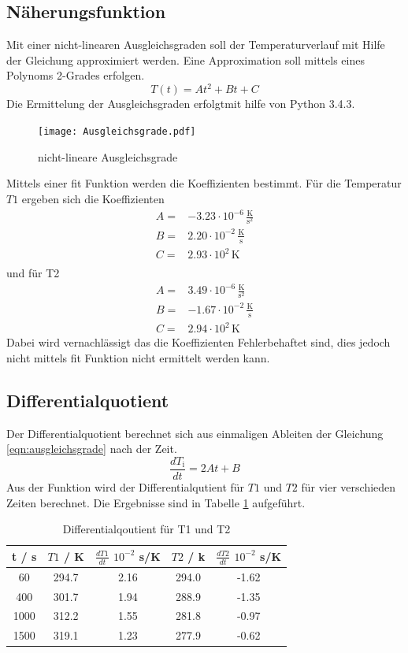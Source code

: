 \subsection{Näherungsfunktion}
Mit einer nicht-linearen Ausgleichsgraden soll der Temperaturverlauf mit Hilfe der Gleichung approximiert werden. Eine Approximation soll mittels eines Polynoms 2-Grades erfolgen.
\begin{equation}
  T(t) = At^2 + Bt +C
  \label{eqn:ausgleichsgrade}
\end{equation}
Die Ermittelung der Ausgleichsgraden erfolgtmit hilfe von Python 3.4.3.
\begin{figure}
  \centering
  \texttt{[image: Ausgleichsgrade.pdf]}
  \caption{nicht-lineare Ausgleichsgrade}
  \label{fig:ausg}
\end{figure}
Mittels einer fit Funktion werden die Koeffizienten bestimmt. Für die Temperatur $T1$ ergeben sich die Koeffizienten 
\begin{eqnarray}
  A =& -3.23 \cdot 10^{-6} \, \frac{\text{K}}{\text{s}^2}	\\ 
  B =& 2.20 \cdot 10^{-2} \, \frac{\text{K}}{\text{s}} 	\\
  C =& 2.93 \cdot 10^{2} \, \text{K} \\
  \label{eqn:koefT1}
\end{eqnarray}
und für T2 
\begin{eqnarray}
  A =& 3.49 \cdot 10^{-6} \, \frac{\text{K}}{\text{s}^2} 	\\
  B =& -1.67 \cdot 10^{-2} \, \frac{\text{K}}{\text{s}} 	\\
  C =& 2.94 \cdot 10^2 \, \text{K}
  \label{eqn:koefT2}
\end{eqnarray}
Dabei wird vernachlässigt das die Koeffizienten Fehlerbehaftet sind, dies jedoch nicht mittels fit Funktion nicht ermittelt werden kann.
\subsection{Differentialquotient}
Der Differentialquotient berechnet sich aus einmaligen Ableiten der Gleichung \ref{eqn:ausgleichsgrade} nach der Zeit.
\begin{equation}
  \frac{dT_{\text{i}}}{dt} = 2At + B
  \label{eqn:diffq}
\end{equation}
Aus der Funktion wird der Differentialqutient für $T1$ und $T2$ für vier verschieden Zeiten berechnet. Die Ergebnisse sind in Tabelle \ref{tab:diffQ} aufgeführt.
\begin{table}
  \centering
  \begin{tabular}{c c c c c}
  	\toprule
	t / s & $T1$ / K & $\frac{dT1}{dt}$ $10^{-2}$ s/K & $T2$ / k & $\frac{dT2}{dt}$ $10^{-2}$ s/K \\
	\midrule
	60	& 294.7 & 2.16 & 294.0 & -1.62 \\
	400	& 301.7 & 1.94 & 288.9 & -1.35 \\
	1000	& 312.2 & 1.55 & 281.8 & -0.97 \\
	1500	& 319.1 & 1.23 & 277.9 & -0.62 \\
	\bottomrule
  \end{tabular}
  \caption{Differentialqoutient für T1 und T2}
  \label{tab:diffQ}
\end{table}

